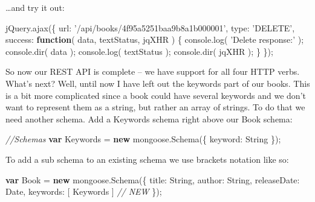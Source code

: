 \documentclass[9pt]{book}
\newenvironment{Shaded}{}{}
\newcommand{\KeywordTok}[1]{\textcolor[rgb]{0.00,0.44,0.13}{\textbf{{#1}}}}
\newcommand{\DataTypeTok}[1]{\textcolor[rgb]{0.56,0.13,0.00}{{#1}}}
\newcommand{\StringTok}[1]{\textcolor[rgb]{0.25,0.44,0.63}{{#1}}}
\newcommand{\CommentTok}[1]{\textcolor[rgb]{0.38,0.63,0.69}{\textit{{#1}}}}
\newcommand{\OtherTok}[1]{\textcolor[rgb]{0.00,0.44,0.13}{{#1}}}
\newcommand{\FunctionTok}[1]{\textcolor[rgb]{0.02,0.16,0.49}{{#1}}}
\newcommand{\NormalTok}[1]{{#1}}
\begin{document}
\ldots{}and try it out:

\begin{Shaded}
\begin{Highlighting}[]
\OtherTok{jQuery}\NormalTok{.}\FunctionTok{ajax}\NormalTok{(\{}
    \DataTypeTok{url}\NormalTok{: }\StringTok{'/api/books/4f95a5251baa9b8a1b000001'}\NormalTok{,}
    \DataTypeTok{type}\NormalTok{: }\StringTok{'DELETE'}\NormalTok{,}
    \DataTypeTok{success}\NormalTok{: }\KeywordTok{function}\NormalTok{( data, textStatus, jqXHR ) \{}
        \OtherTok{console}\NormalTok{.}\FunctionTok{log}\NormalTok{( }\StringTok{'Delete response:'} \NormalTok{);}
        \OtherTok{console}\NormalTok{.}\FunctionTok{dir}\NormalTok{( data );}
        \OtherTok{console}\NormalTok{.}\FunctionTok{log}\NormalTok{( textStatus );}
        \OtherTok{console}\NormalTok{.}\FunctionTok{dir}\NormalTok{( jqXHR );}
    \NormalTok{\}}
\NormalTok{\});}
\end{Highlighting}
\end{Shaded}

So now our REST API is complete -- we have support for all four HTTP
verbs. What's next? Well, until now I have left out the keywords part of
our books. This is a bit more complicated since a book could have
several keywords and we don't want to represent them as a string, but
rather an array of strings. To do that we need another schema. Add a
Keywords schema right above our Book schema:

\begin{Shaded}
\begin{Highlighting}[]
\CommentTok{//Schemas}
\KeywordTok{var} \NormalTok{Keywords = }\KeywordTok{new} \OtherTok{mongoose}\NormalTok{.}\FunctionTok{Schema}\NormalTok{(\{}
    \DataTypeTok{keyword}\NormalTok{: String}
\NormalTok{\});}
\end{Highlighting}
\end{Shaded}

To add a sub schema to an existing schema we use brackets notation like
so:

\begin{Shaded}
\begin{Highlighting}[]
\KeywordTok{var} \NormalTok{Book = }\KeywordTok{new} \OtherTok{mongoose}\NormalTok{.}\FunctionTok{Schema}\NormalTok{(\{}
    \DataTypeTok{title}\NormalTok{: String,}
    \DataTypeTok{author}\NormalTok{: String,}
    \DataTypeTok{releaseDate}\NormalTok{: Date,}
    \DataTypeTok{keywords}\NormalTok{: [ Keywords ]                       }\CommentTok{// NEW}
\NormalTok{\});}
\end{Highlighting}
\end{Shaded}
\end{document}
